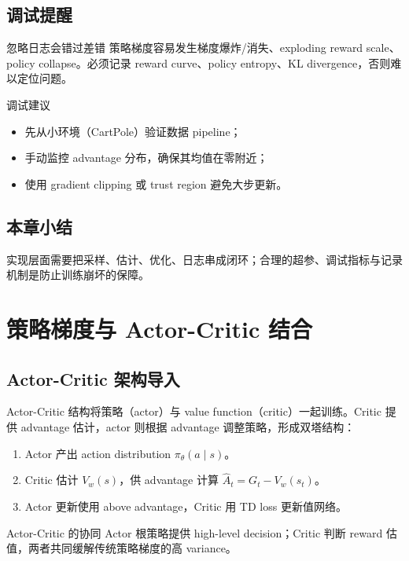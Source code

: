 \documentclass[a4paper]{article}
\begin{document}
\subsection{调试提醒}
\begin{warningbox}{忽略日志会错过差错}
策略梯度容易发生梯度爆炸/消失、exploding reward scale、policy collapse。必须记录 reward curve、policy entropy、KL divergence，否则难以定位问题。
\end{warningbox}

\begin{importantbox}{调试建议}
\begin{itemize}
    \item 先从小环境（CartPole）验证数据 pipeline；
    \item 手动监控 advantage 分布，确保其均值在零附近；
    \item 使用 gradient clipping 或 trust region 避免大步更新。
\end{itemize}
\end{importantbox}

\subsection{本章小结}
实现层面需要把采样、估计、优化、日志串成闭环；合理的超参、调试指标与记录机制是防止训练崩坏的保障。

\section{策略梯度与 Actor-Critic 结合}
\subsection{Actor-Critic 架构导入}
Actor-Critic 结构将策略（actor）与 value function（critic）一起训练。Critic 提供 advantage 估计，actor 则根据 advantage 调整策略，形成双塔结构：
\begin{enumerate}
    \item Actor 产出 action distribution $\pi_\theta(a\mid s)$。
    \item Critic 估计 $V_w(s)$，供 advantage 计算 $\hat{A}_t = G_t - V_w(s_t)$。
    \item Actor 更新使用 above advantage，Critic 用 TD loss 更新值网络。
\end{enumerate}
\begin{knowledgebox}{Actor-Critic 的协同}
Actor 根策略提供 high-level decision；Critic 判断 reward 估值，两者共同缓解传统策略梯度的高 variance。
\end{knowledgebox}
\end{document}
